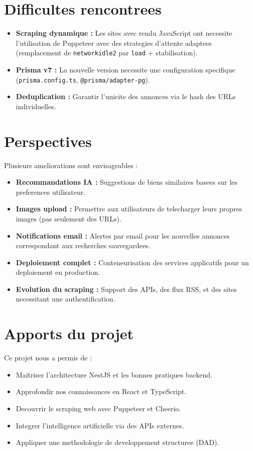 \documentclass[12pt,a4paper]{report}
\begin{document}
\section*{Difficultes rencontrees}

\begin{itemize}
  \item \textbf{Scraping dynamique :} Les sites avec rendu JavaScript ont necessite l'utilisation de Puppeteer avec des strategies d'attente adaptees (remplacement de \texttt{networkidle2} par \texttt{load} + stabilisation).
  \item \textbf{Prisma v7 :} La nouvelle version necessite une configuration specifique (\texttt{prisma.config.ts}, \texttt{@prisma/adapter-pg}).
  \item \textbf{Deduplication :} Garantir l'unicite des annonces via le hash des URLs individuelles.
\end{itemize}

\section*{Perspectives}

Plusieurs ameliorations sont envisageables :
\begin{itemize}
  \item \textbf{Recommandations IA :} Suggestions de biens similaires basees sur les preferences utilisateur.
  \item \textbf{Images upload :} Permettre aux utilisateurs de telecharger leurs propres images (pas seulement des URLs).
  \item \textbf{Notifications email :} Alertes par email pour les nouvelles annonces correspondant aux recherches sauvegardees.
  \item \textbf{Deploiement complet :} Conteneurisation des services applicatifs pour un deploiement en production.
  \item \textbf{Evolution du scraping :} Support des APIs, des flux RSS, et des sites necessitant une authentification.
\end{itemize}

\section*{Apports du projet}

Ce projet nous a permis de :
\begin{itemize}
  \item Maitriser l'architecture NestJS et les bonnes pratiques backend.
  \item Approfondir nos connaissances en React et TypeScript.
  \item Decouvrir le scraping web avec Puppeteer et Cheerio.
  \item Integrer l'intelligence artificielle via des APIs externes.
  \item Appliquer une methodologie de developpement structuree (DAD).
\end{itemize}
\end{document}
